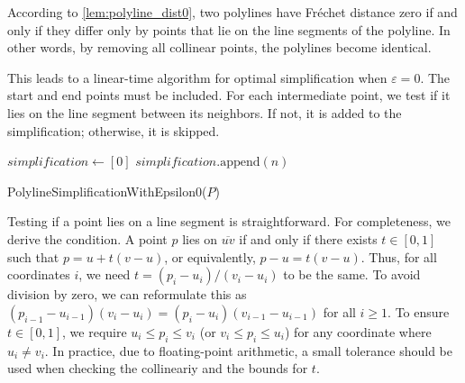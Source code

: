 According to \cref{lem:polyline_dist0}, two polylines have Fréchet distance zero if and only if they differ only by points that lie on the line segments of the polyline. In other words, by removing all collinear points, the polylines become identical.

This leads to a linear-time algorithm for optimal simplification when \(\varepsilon = 0\). The start and end points must be included. For each intermediate point, we test if it lies on the line segment between its neighbors. If not, it is added to the simplification; otherwise, it is skipped.

\begin{algorithm}[ht]
  \DontPrintSemicolon
  \BlankLine
	\(simplification \gets [0]\)\;
	\(simplification.\text{append}(n)\)
  \caption{PolylineSimplificationWithEpsilon0(\(P\))}
  \label{algo:simplify_epsilon0}
\end{algorithm}

Testing if a point lies on a line segment is straightforward. For completeness, we derive the condition. A point \(p\) lies on \(\overline{uv}\) if and only if there exists \(t \in [0,1]\) such that \(p = u + t(v-u)\), or equivalently, \(p - u = t(v-u)\). Thus, for all coordinates \(i\), we need \(t = (p_i - u_i)/(v_i - u_i)\) to be the same. To avoid division by zero, we can reformulate this as \((p_{i-1} - u_{i-1})(v_i - u_i) = (p_i - u_i)(v_{i-1} - u_{i-1})\) for all \(i \geq 1\). To ensure \(t \in [0, 1]\), we require \(u_i \leq p_i \leq v_i\) (or \(v_i \leq p_i \leq u_i\)) for any coordinate where \(u_i \neq v_i\). In practice, due to floating-point arithmetic, a small tolerance should be used when checking the collineariy and the bounds for \(t\).
